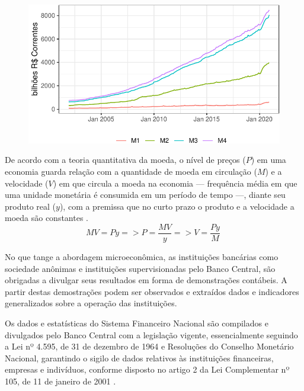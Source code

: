 \documentclass[12pt,12pt,openright,oneside,a4paper,chapter=TITLE,section=TITLE,subsection=TITLE,subsubsection=TITLE,english,french,spanish,portugues,sumario=tradicional]{abntex2}
\begin{document}
\begin{figure}

\begin{center}\includegraphics{12-exportedfigures/m2m3m4-1} \end{center}
\label{fig:agrag}
\end{figure}

De acordo com a teoria quantitativa da moeda, o nível de preços (\(P\)) em uma economia guarda relação com a quantidade de moeda em circulação (\(M\)) e a velocidade (\(V\)) em que circula a moeda na economia --- frequência média em que uma unidade monetária é consumida em um período de tempo ---, diante seu produto real (\(y\)), com a premissa que no curto prazo o produto e a velocidade a moeda são constantes \cite{vasconcellos:2011}.
\[
MV = Py => P = \frac{MV}{y} => V = \frac{Py}{M}\
\]

No que tange a abordagem microeconômica, as instituições bancárias como sociedade anônimas e instituições supervisionadas pelo Banco Central, são obrigadas a divulgar seus resultados em forma de demonstrações contábeis. A partir destas demostrações podem ser observados e extraídos dados e indicadores generalizados sobre a operação das instituições.

Os dados e estatísticas do Sistema Financeiro Nacional são compilados e divulgados pelo Banco Central com a legislação vigente, essencialmente seguindo a Lei nº 4.595, de 31 de dezembro de 1964 e Resoluções do Conselho Monetário Nacional, garantindo o sigilo de dados relativos às instituições financeiras, empresas e indivíduos, conforme disposto no artigo 2 da Lei Complementar nº 105, de 11 de janeiro de 2001 \cite{sgs:bm}.
\end{document}
